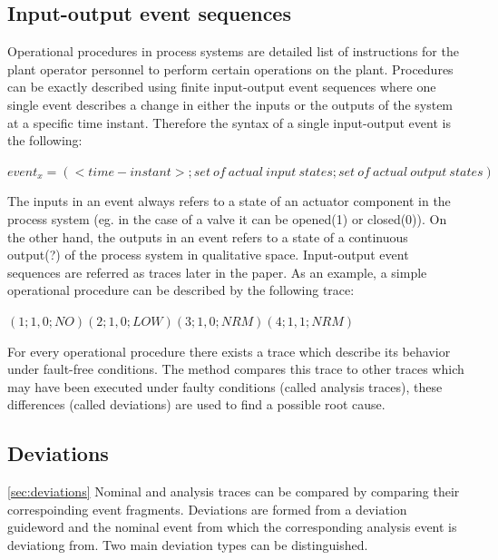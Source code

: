 \documentclass[conference]{IEEEtran}
\begin{document}
\subsection{Input-output event sequences}
\label{sec:ioseq}

Operational procedures in process systems are detailed list of instructions for the plant operator personnel to perform certain operations on the plant. Procedures can be exactly described using finite input-output event sequences where one single event describes a change in either the inputs or the outputs of the system at a specific time instant. Therefore the syntax of a single input-output event is the following:

$event_x = (<time-instant>;{set~of~actual~input~states};{set~of~actual~output~states})$

The inputs in an event always refers to a state of an actuator component in the process system (eg. in the case of a valve it can be opened(1) or closed(0)). On the other hand, the outputs in an event refers to a state of a continuous output(?) of the process system in qualitative space. Input-output event sequences are referred as traces later in the paper. As an example, a simple operational procedure can be described by the following trace:

$(1;1,0;NO) (2;1,0;LOW) (3;1,0;NRM) (4;1,1;NRM)$

For every operational procedure there exists a trace which describe its behavior under fault-free conditions. The method compares this trace to other traces which may have been executed under faulty conditions (called analysis traces), these differences (called deviations) are used to find a possible root cause.

\subsection{Deviations}
\ref{sec:deviations}
Nominal and analysis traces can be compared by comparing their correspoinding event fragments. Deviations are formed from a deviation guideword and the nominal event from which the corresponding analysis event is deviationg from. Two main deviation types can be distinguished.
\end{document}
